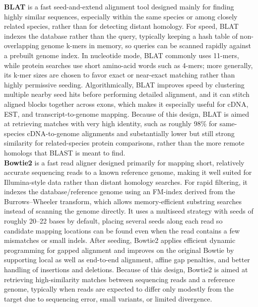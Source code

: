 \documentclass{article}
\begin{document}
\textbf{BLAT} is a fast seed-and-extend alignment tool designed mainly for finding highly similar sequences, especially within the same species or among closely related species, rather than for detecting distant homology. For speed, BLAT indexes the database rather than the query, typically keeping a hash table of non-overlapping genome k-mers in memory, so queries can be scanned rapidly against a prebuilt genome index. In nucleotide mode, BLAT commonly uses 11-mers, while protein searches use short amino-acid words such as 4-mers; more generally, its k-mer sizes are chosen to favor exact or near-exact matching rather than highly permissive seeding. Algorithmically, BLAT improves speed by clustering multiple nearby seed hits before performing detailed alignment, and it can stitch aligned blocks together across exons, which makes it especially useful for cDNA, EST, and transcript-to-genome mapping. Because of this design, BLAT is aimed at retrieving matches with very high identity, such as roughly 98\% for same-species cDNA-to-genome alignments and substantially lower but still strong similarity for related-species protein comparisons, rather than the more remote homologs that BLAST is meant to find.\\
\textbf{Bowtie2} is a fast read aligner designed primarily for mapping short, relatively accurate sequencing reads to a known reference genome, making it well suited for Illumina-style data rather than distant homology searches. For rapid filtering, it indexes the database/reference genome using an FM-index derived from the Burrows–Wheeler transform, which allows memory-efficient substring searches instead of scanning the genome directly. It uses a multiseed strategy with seeds of roughly 20–22 bases by default, placing several seeds along each read so candidate mapping locations can be found even when the read contains a few mismatches or small indels. After seeding, Bowtie2 applies efficient dynamic programming for gapped alignment and improves on the original Bowtie by supporting local as well as end-to-end alignment, affine gap penalties, and better handling of insertions and deletions. Because of this design, Bowtie2 is aimed at retrieving high-similarity matches between sequencing reads and a reference genome, typically when reads are expected to differ only modestly from the target due to sequencing error, small variants, or limited divergence.\\
\end{document}
